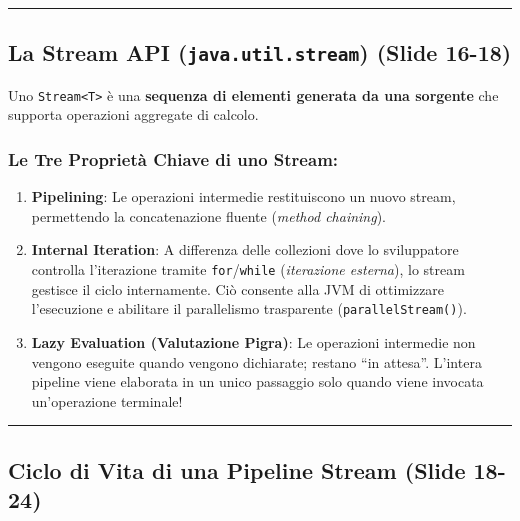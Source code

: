 \documentclass[11pt,a4paper,oneside]{report}
\newcommand{\passthrough}[1]{#1}
\providecommand{\tightlist}{\setlength{\itemsep}{0pt}\setlength{\parskip}{0pt}}
\begin{document}
\begin{center}\rule{0.5\linewidth}{0.5pt}\end{center}

\subsection{\texorpdfstring{La Stream API (\texttt{java.util.stream})
(Slide
16-18)}{La Stream API (java.util.stream) (Slide 16-18)}}\label{chap17_la-stream-api-java.util.stream-slide-16-18}

Uno \passthrough{\lstinline!Stream<T>!} è una \textbf{sequenza di
elementi generata da una sorgente} che supporta operazioni aggregate di
calcolo.

\subsubsection{Le Tre Proprietà Chiave di uno
Stream:}\label{chap17_le-tre-proprietuxe0-chiave-di-uno-stream}

\begin{enumerate}
\def\labelenumi{\arabic{enumi}.}
\tightlist
\item
  \textbf{Pipelining}: Le operazioni intermedie restituiscono un nuovo
  stream, permettendo la concatenazione fluente (\emph{method
  chaining}).
\item
  \textbf{Internal Iteration}: A differenza delle collezioni dove lo
  sviluppatore controlla l'iterazione tramite
  \passthrough{\lstinline!for!}/\passthrough{\lstinline!while!}
  (\emph{iterazione esterna}), lo stream gestisce il ciclo internamente.
  Ciò consente alla JVM di ottimizzare l'esecuzione e abilitare il
  parallelismo trasparente (\passthrough{\lstinline!parallelStream()!}).
\item
  \textbf{Lazy Evaluation (Valutazione Pigra)}: Le operazioni intermedie
  non vengono eseguite quando vengono dichiarate; restano ``in attesa''.
  L'intera pipeline viene elaborata in un unico passaggio solo quando
  viene invocata un'operazione terminale!
\end{enumerate}

\begin{center}\rule{0.5\linewidth}{0.5pt}\end{center}

\subsection{Ciclo di Vita di una Pipeline Stream (Slide
18-24)}\label{chap17_ciclo-di-vita-di-una-pipeline-stream-slide-18-24}
\end{document}
